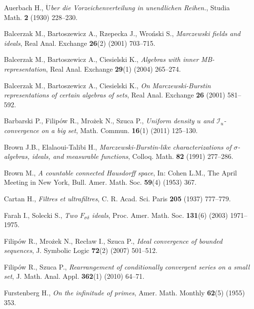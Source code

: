 \documentclass{amsart}
\theoremstyle{definition}
\theoremstyle{definition}
\newcommand{\I}{\mathcal I}
\begin{document}






\begin{thebibliography}{abc}

Auerbach H., \emph{$\ddot{\textrm{U}}$ber die Vorzeichenverteilung in unendlichen Reihen.},
Studia Math. {\bf 2} (1930) 228--230.

Balcerzak M., Bartoszewicz A., Rzepecka J., Wroński S., \emph{Marczewski fields and ideals},
Real Anal. Exchange {\bf 26}(2) (2001) 703--715.

Balcerzak M., Bartoszewicz A., Ciesielski K., \emph{Algebras with inner MB-representation},
Real Anal. Exchange {\bf 29}(1) (2004) 265--274.

Balcerzak M., Bartoszewicz A., Ciesielski K., \emph{On Marczewski-Burstin representations of certain algebras of sets},
Real Anal. Exchange {\bf 26} (2001) 581--592.

Barbarski P., Filipów R., Mrożek N., Szuca P., \emph{Uniform density $u$ and $\I_u$-convergence on a big set},
Math. Commun. {\bf 16}(1) (2011) 125--130.

Brown J.B., Elalaoui-Talibi H., \emph{Marczewski-Burstin-like characterizations of $\sigma$-algebras, ideals, and measurable functions},
Colloq. Math. {\bf 82} (1991) 277--286.

Brown M., \emph{A countable connected Hausdorff space},
In: Cohen L.M., The April Meeting in New York, Bull. Amer. Math. Soc. {\bf 59}(4) (1953) 367.

Cartan H., \emph{Filtres et ultrafiltres},
C. R. Acad. Sci. Paris {\bf 205} (1937) 777--779.

Farah I., Solecki S., \emph{Two $F_{\sigma\delta}$ ideals},
Proc. Amer. Math. Soc. {\bf 131}(6) (2003) 1971--1975.

Filipów R., Mrożek N., Recław I., Szuca P., \emph{Ideal convergence of bounded sequences},
J. Symbolic Logic {\bf 72}(2) (2007) 501--512.

Filipów R., Szuca P., \emph{Rearrangement of conditionally convergent series on a small set},
J. Math. Anal. Appl. {\bf 362}(1) (2010) 64--71.

Furstenberg H., \emph{On the infinitude of primes},
Amer. Math. Monthly {\bf 62}(5) (1955) 353.


\end{thebibliography}
\end{document}
